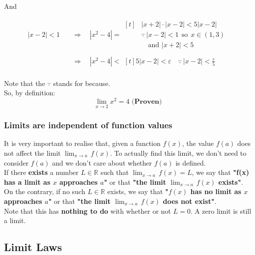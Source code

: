 \documentclass[11pt]{article}
\begin{document}
And

\begin{align*}
|x - 2| < 1 \quad &\Rightarrow \quad |x^2 - 4| = \begin{aligned}[t]
&|x + 2| \cdot |x - 2| < 5|x - 2| \\
&\because \ |x - 2| < 1 \ \ \text{so} \ \ x \in (1, 3) \\
& \quad \text{and } |x + 2| < 5
\end{aligned} \\
\\
&\Rightarrow \quad |x^2 - 4| < \begin{aligned}[t]
5|x - 2| < \varepsilon \quad \because \ |x - 2| < \frac{\varepsilon}{5}
\end{aligned}
\end{align*}
\\[0pt]

Note that the \(\because\) stands for because.
\\[0pt]

So, by definition:
\[\lim_{x \rightarrow 2} x^2 = 4 \textbf{ (Proven)}\]


\subsubsection{Limits are independent of function values}
\label{sec:org2425974}
It is very important to realise that, given a function \(f(x)\), the value \(f(a)\) does not affect the limit \(\lim_{x \rightarrow a} \, f(x)\). To actually find this limit, we don't need to consider \(f(a)\) and we don't care about whether \(f(a)\) is defined.
\\[0pt]

If there \textbf{exists} a number \(L \in \mathbb{R}\) such that \(\lim_{x \rightarrow a} \, f(x) = L\), we say that \textbf{"f(x) has a limit as \(x\) approaches \(a\)"} or that \textbf{"the limit \(\lim_{x \rightarrow a} \, f(x)\) exists"}.
\\[0pt]

On the contrary, if no such \(L \in \mathbb{R}\) exists, we say that \textbf{"\(f(x)\) has no limit as \(x\) approaches \(a\)"} or that \textbf{"the limit \(\lim_{x \rightarrow a} \, f(x)\) does not exist"}.
\\[0pt]

Note that this has \textbf{nothing to do} with whether or not \(L = 0\). A zero limit is still a limit.

\newpage

\subsection{Limit Laws}
\label{sec:orgd0b800f}
\end{document}
